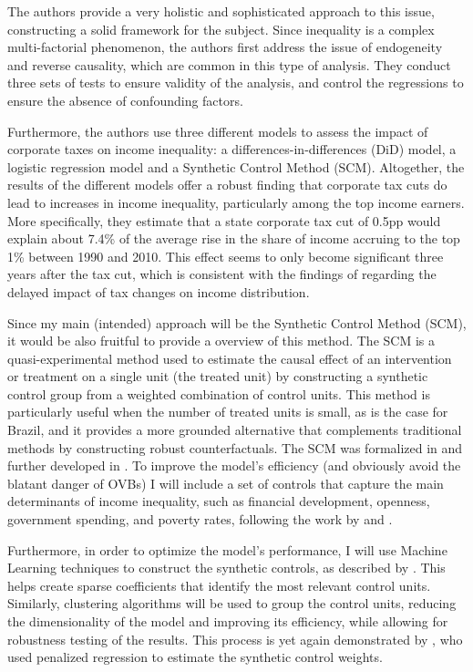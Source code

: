 \documentclass[a4paper, 12pt]{article}
\begin{document}
The authors provide a very holistic and sophisticated approach to this issue, constructing a solid framework for the subject.
Since inequality is a complex multi-factorial phenomenon, the authors first address the issue of endogeneity and reverse causality, which are common in this type of analysis.
They conduct three sets of tests to ensure validity of the analysis, and control the regressions to ensure the absence of confounding factors.
\par
Furthermore, the authors use three different models to assess the impact of corporate taxes on income inequality: a differences-in-differences (DiD) model, a logistic regression model and a Synthetic Control Method (SCM).
Altogether, the results of the different models offer a robust finding that corporate tax cuts do lead to increases in income inequality, particularly among the top income earners.
More specifically, they estimate that a state corporate tax cut of 0.5pp would explain about 7.4\% of the average rise in the share of income accruing to the top 1\% between 1990 and 2010.
This effect seems to only become significant three years after the tax cut, which is consistent with the findings of \cite{berman2024capital} regarding the delayed impact of tax changes on income distribution.
\par    
Since my main (intended) approach will be the Synthetic Control Method (SCM), it would be also fruitful to provide a overview of this method.
The SCM is a quasi-experimental method used to estimate the causal effect of an intervention or treatment on a single unit (the treated unit) by constructing a synthetic control group from a weighted combination of control units. 
This method is particularly useful when the number of treated units is small, as is the case for Brazil, and it provides a more grounded alternative that complements traditional methods by constructing robust counterfactuals.
The SCM was formalized in \cite{abadie2003economic} and further developed in \cite{abadie2010synthetic}.
To improve the model’s efficiency (and obviously avoid the blatant danger of OVBs) I will include a set of controls that capture the main determinants of income inequality, such as financial development, openness, government spending, and poverty rates, following the work by \cite{afandi2017determinants} and \cite{roine2009long}.
\par
Furthermore, in order to optimize the model’s performance, I will use Machine Learning techniques to construct the synthetic controls, as described by \cite{araujo2023synthetic}.
This helps create sparse coefficients that identify the most relevant control units.
Similarly, clustering algorithms will be used to group the control units, reducing the dimensionality of the model and improving its efficiency, while allowing for robustness testing of the results.
This process is yet again demonstrated by \cite{abadie2023penalized}, who used penalized regression to estimate the synthetic control weights.
\end{document}
